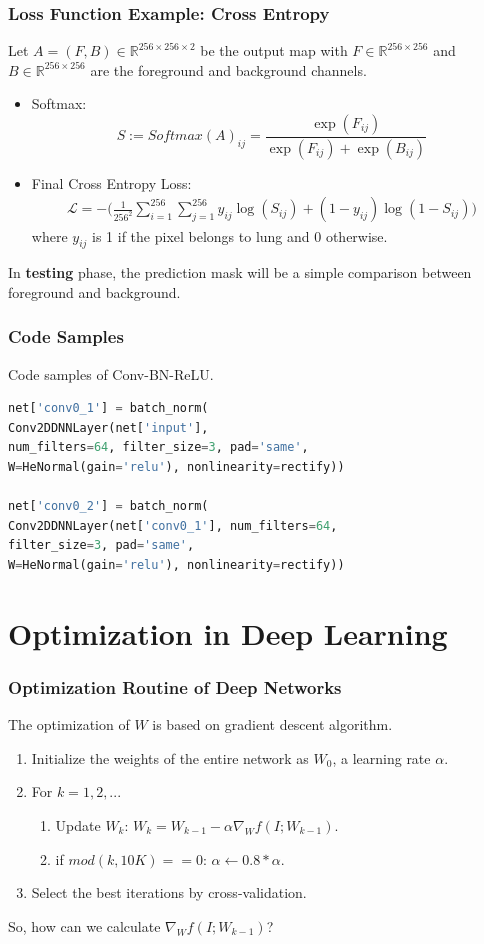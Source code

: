 \documentclass[10pt]{beamer}
\newcommand{\R}{{\mathbb R}}
\begin{document}
\begin{frame}
\frametitle{Loss Function Example: Cross Entropy}
Let $A = (F, B) \in \R^{256\times 256 \times 2}$ be the output map with $F \in \R^{256\times 256}$ and $B \in \R^{256 \times 256}$ are the foreground and background channels. 
\begin{itemize}
	\item Softmax: 
	\[
	S := Softmax(A)_{ij} = \frac{\exp(F_{ij})}{\exp(F_{ij}) + \exp(B_{ij})}
	\]
	\item Final Cross Entropy Loss:
	\begin{align*}
	\mathcal{L} = -\bigg(\frac{1}{256^2}\sum_{i=1}^{256} \sum_{j=1}^{256}y_{ij} \log(S_{ij}) + (1-y_{ij}) \log(1-S_{ij})\bigg)
	\end{align*}
	where $y_{ij}$ is 1 if the pixel belongs to lung and 0 otherwise.
\end{itemize}
In \textbf{testing} phase, the prediction mask will be a simple comparison between foreground and background.
\end{frame}

\begin{frame}[fragile]
\frametitle{Code Samples}
Code samples of Conv-BN-ReLU.
\begin{lstlisting}[language=Python,keywordstyle=\color{red}]
net['conv0_1'] = batch_norm(
Conv2DDNNLayer(net['input'], 
num_filters=64, filter_size=3, pad='same', 
W=HeNormal(gain='relu'), nonlinearity=rectify))

net['conv0_2'] = batch_norm(
Conv2DDNNLayer(net['conv0_1'], num_filters=64, 
filter_size=3, pad='same',
W=HeNormal(gain='relu'), nonlinearity=rectify))
\end{lstlisting}

\end{frame}


\section{Optimization in Deep Learning}
\begin{frame}
	\frametitle{Optimization Routine of Deep Networks}
	The optimization of $W$ is based on gradient descent algorithm.
	\begin{enumerate}
		\item Initialize the weights  of the entire network as $W_0$, a learning rate $\alpha$.
		\item For $k = 1,2, ...$
		\begin{enumerate}
			\item Update $W_k$: $W_k = W_{k-1} - \alpha \nabla_W f(I;W_{k-1})$.
			\item if $mod(k, 10K) == 0$: $\alpha \leftarrow 0.8*\alpha$.
		\end{enumerate}
		\item Select the best iterations by cross-validation.
	\end{enumerate}
So, how can we calculate $\nabla_W f(I;W_{k-1})$?
\end{frame}
\end{document}
